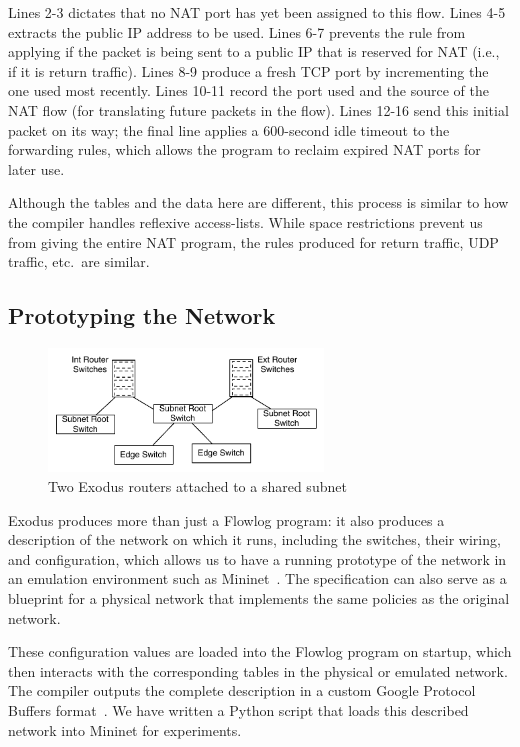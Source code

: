 \noindent
Lines 2-3 dictates that no NAT port has yet been assigned to this
flow. Lines 4-5 extracts the public IP address to be used. Lines 6-7
prevents the rule from applying if the packet is being sent to a
public IP that is reserved for NAT (i.e., if it is return
traffic). Lines 8-9 produce a fresh TCP port by incrementing the one used most recently. Lines 10-11 record the port
used and the source of the NAT flow (for translating future packets in
the flow). Lines 12-16 send this initial packet on its way; the final
 line applies a 600-second idle timeout to the forwarding
rules, which allows the program to reclaim expired NAT ports for later
use.

Although the tables and the data here are different, this process is similar
to how the compiler handles reflexive access-lists. While space restrictions prevent us
from giving the entire NAT program, the rules produced for return traffic, UDP
traffic, etc.\ are similar.

\subsection{Prototyping the Network}
\label{sec:prototyping}

\begin{figure}
  \centering
  \includegraphics[width=0.65\textwidth]{figs/flowlog-network.pdf}
  \caption{Two Exodus routers attached to a shared subnet}
  \label{fig:flowlog-network}
\end{figure}

Exodus produces more than just a Flowlog program: it also produces a
description of the network on which it runs, including the switches, their
wiring, and configuration, which allows us to have a running prototype of the
network in an emulation environment such as Mininet~\cite{lantz++:hotnets10-mininet}. The specification can also
serve as a blueprint for a physical network that implements the same policies
as the original network.

These configuration values are loaded into the Flowlog program on startup,
which then interacts with the corresponding tables in the physical or
emulated network.  The compiler outputs the complete description in a custom
Google Protocol Buffers format~\cite{protobufs}.  We have written a Python
script that loads this described network into Mininet for experiments.

